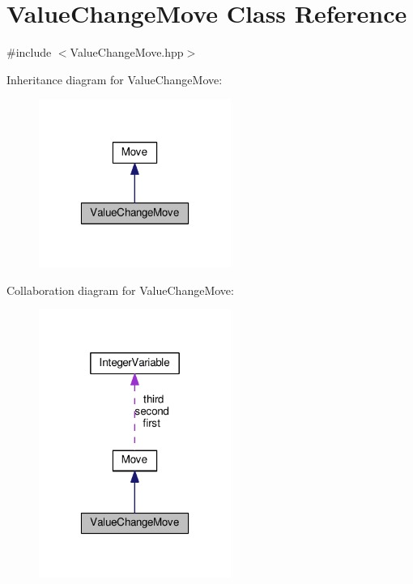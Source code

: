 \hypertarget{class_value_change_move}{\section{Value\-Change\-Move Class Reference}
\label{class_value_change_move}
}


{\ttfamily \#include $<$Value\-Change\-Move.\-hpp$>$}



Inheritance diagram for Value\-Change\-Move\-:\nopagebreak
\begin{figure}[H]
\begin{center}
\leavevmode
\includegraphics[width=178pt]{class_value_change_move__inherit__graph}
\end{center}
\end{figure}


Collaboration diagram for Value\-Change\-Move\-:\nopagebreak
\begin{figure}[H]
\begin{center}
\leavevmode
\includegraphics[width=178pt]{class_value_change_move__coll__graph}
\end{center}
\end{figure}
